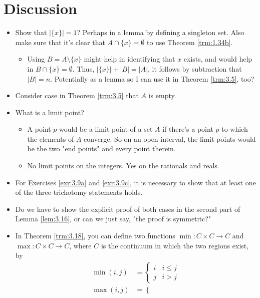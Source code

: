 \documentclass[titlepage]{report}
\begin{document}
\section{Discussion}
\begin{itemize}
    \item {}Show that $|\{x\}|=1$? Perhaps in a lemma by defining a singleton set. Also make sure that it's clear that $A\cap\{x\}=\emptyset$ to use Theorem \ref{trm:1.34b}.
    \begin{itemize}
        \item Using $B=A\setminus\{x\}$ might help in identifying that $x$ exists, and would help in $B\cap\{x\}=\emptyset$. Thus, $|\{x\}|+|B|=|A|$, it follows by subtraction that $|B|=n$. Potentially as a lemma so I can use it in Theorem \ref{trm:3.5}, too?
    \end{itemize}
    \item Consider case in Theorem \ref{trm:3.5} that $A$ is empty.
    \item What is a limit point?
    \begin{itemize}
        \item A point $p$ would be a limit point of a set $A$ if there's a point $p$ to which the elements of $A$ converge. So on an open interval, the limit points would be the two "end points" and every point therein.
        \item No limit points on the integers. Yes on the rationals and reals.
    \end{itemize}
    \item {}For Exercises \ref{exr:3.9a} and \ref{exr:3.9c}, it is necessary to show that at least one of the three trichotomy statements holds.
    \item {}Do we have to show the explicit proof of both cases in the second part of Lemma \ref{lem:3.16}, or can we just say, "the proof is symmetric?"
    \item In Theorem \ref{trm:3.18}, you can define two functions $\min:C\times C\to C$ and $\max:C\times C\to C$, where $C$ is the continuum in which the two regions exist, by
    \begin{align*}
        \min(i,j) &=
        \begin{cases}
            i & i\leq j\\
            j & i>j
        \end{cases}\\
        \max(i,j) &=
        \begin{cases}

\end{cases}
\end{align*}
\end{itemize}
\end{document}
